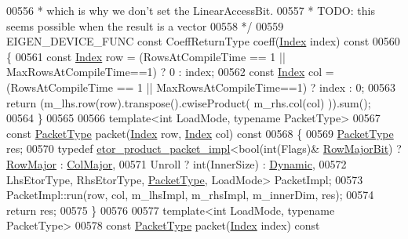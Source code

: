 \begin{DoxyCode}
00556 \textcolor{comment}{   * which is why we don't set the LinearAccessBit.}
00557 \textcolor{comment}{   * TODO: this seems possible when the result is a vector}
00558 \textcolor{comment}{   */}
00559   EIGEN\_DEVICE\_FUNC \textcolor{keyword}{const} CoeffReturnType coeff(\hyperlink{namespace_eigen_a62e77e0933482dafde8fe197d9a2cfde}{Index} index)\textcolor{keyword}{ const}
00560 \textcolor{keyword}{  }\{
00561     \textcolor{keyword}{const} \hyperlink{namespace_eigen_a62e77e0933482dafde8fe197d9a2cfde}{Index} row = (RowsAtCompileTime == 1 || MaxRowsAtCompileTime==1) ? 0 : index;
00562     \textcolor{keyword}{const} \hyperlink{namespace_eigen_a62e77e0933482dafde8fe197d9a2cfde}{Index} col = (RowsAtCompileTime == 1 || MaxRowsAtCompileTime==1) ? index : 0;
00563     \textcolor{keywordflow}{return} (m\_lhs.row(row).transpose().cwiseProduct( m\_rhs.col(col) )).sum();
00564   \}
00565 
00566   \textcolor{keyword}{template}<\textcolor{keywordtype}{int} LoadMode, \textcolor{keyword}{typename} PacketType>
00567   \textcolor{keyword}{const} \hyperlink{struct_eigen_1_1_packet_type}{PacketType} packet(\hyperlink{namespace_eigen_a62e77e0933482dafde8fe197d9a2cfde}{Index} row, \hyperlink{namespace_eigen_a62e77e0933482dafde8fe197d9a2cfde}{Index} col)\textcolor{keyword}{ const}
00568 \textcolor{keyword}{  }\{
00569     \hyperlink{struct_eigen_1_1_packet_type}{PacketType} res;
00570     \textcolor{keyword}{typedef} \hyperlink{struct_eigen_1_1internal_1_1etor__product__packet__impl}{etor\_product\_packet\_impl}<bool(\textcolor{keywordtype}{int}(Flags)&
      \hyperlink{group__flags_gae4f56c2a60bbe4bd2e44c5b19cbe8762}{RowMajorBit}) ? \hyperlink{group__enums_ggaacded1a18ae58b0f554751f6cdf9eb13acfcde9cd8677c5f7caf6bd603666aae3}{RowMajor} : \hyperlink{group__enums_ggaacded1a18ae58b0f554751f6cdf9eb13a0cbd4bdd0abcfc0224c5fcb5e4f6669a}{ColMajor},
00571                                      Unroll ? int(InnerSize) : \hyperlink{namespace_eigen_ad81fa7195215a0ce30017dfac309f0b2}{Dynamic},
00572                                      LhsEtorType, RhsEtorType, \hyperlink{struct_eigen_1_1_packet_type}{PacketType}, LoadMode> PacketImpl;
00573     PacketImpl::run(row, col, m\_lhsImpl, m\_rhsImpl, m\_innerDim, res);
00574     \textcolor{keywordflow}{return} res;
00575   \}
00576 
00577   \textcolor{keyword}{template}<\textcolor{keywordtype}{int} LoadMode, \textcolor{keyword}{typename} PacketType>
00578   \textcolor{keyword}{const} \hyperlink{struct_eigen_1_1_packet_type}{PacketType} packet(\hyperlink{namespace_eigen_a62e77e0933482dafde8fe197d9a2cfde}{Index} index)\textcolor{keyword}{ const}

\end{DoxyCode}
